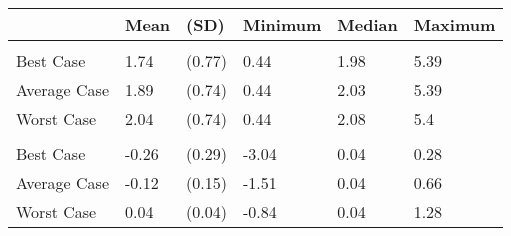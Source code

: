 
\begin{tabular}[t]{llllll}
\toprule
 & Mean & (SD) & Minimum & Median & Maximum\\
\midrule
\addlinespace[0.3em]
\multicolumn{6}{l}{\textbf{Prices}}\\
\hspace{1em}Best Case & 1.74 & (0.77) & 0.44 & 1.98 & 5.39\\
\hspace{1em}Average Case & 1.89 & (0.74) & 0.44 & 2.03 & 5.39\\
\hspace{1em}Worst Case & 2.04 & (0.74) & 0.44 & 2.08 & 5.4\\
\addlinespace[0.3em]
\multicolumn{6}{l}{\textbf{Price Change}}\\
\hspace{1em}Best Case & -0.26 & (0.29) & -3.04 & 0.04 & 0.28\\
\hspace{1em}Average Case & -0.12 & (0.15) & -1.51 & 0.04 & 0.66\\
\hspace{1em}Worst Case & 0.04 & (0.04) & -0.84 & 0.04 & 1.28\\
\bottomrule
\end{tabular}
